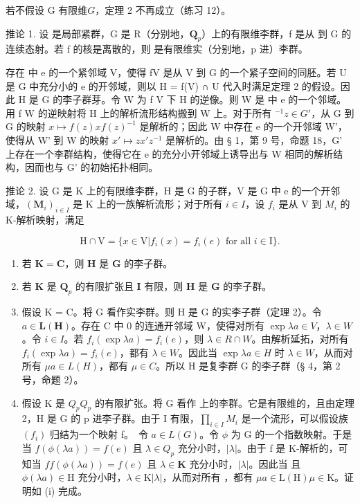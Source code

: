 若不假设 G 有限维\(G\)，定理 2 不再成立（练习 12）。

 推论 1. 设  是局部紧群，G 是 R（分别地，\(\mathbf{Q}_{p}\)）上的有限维李群，f 是从  到 G 的连续态射。若 f 的核是离散的，则  是有限维实（分别地，p 进）李群。

存在  中 e 的一个紧邻域 V，使得 f\textbar V 是从 V 到 G 的一个紧子空间的同胚。若 U 是 G 中充分小的 e 的开邻域，则以 H = f(V) ∩ U 代入时满足定理 2 的假设。因此 H 是 G 的李子群芽。令 W 为 f\textbar{} V 下 H 的逆像。则 W 是  中 e 的一个邻域。用 f\textbar{} W 的逆映射将 H 上的解析流形结构搬到 W 上。对于所有 \(^{-1}\)\(z \in G'\)，从 G 到 G 的映射 \(x \mapsto f(z)xf(z)^{-1}\) 是解析的；因此 W 中存在 e 的一个开邻域 W'，使得从 W' 到 W 的映射 \(x' \mapsto zx'z^{-1}\) 是解析的。由 § 1，第 9 号，命题 18，G' 上存在一个李群结构，使得它在 e 的充分小开邻域上诱导出与 W 相同的解析结构，因而也与 G' 的初始拓扑相同。

推论 2. 设 G 是 K 上的有限维李群，H 是 G 的子群，V 是 G 中 e 的一个开邻域，\((\mathbf{M}_{i})_{i\in I}\) 是 K 上的一族解析流形；对于所有 \(i\in I\)，设 \(f_{i}\) 是从 V 到 \(M_{i}\) 的 K-解析映射，满足

\[
\mathrm{H} \cap \mathrm{V} = \{x \in \mathrm{V} | f _ {i} (x) = f _ {i} (e) \text {   for   all   } i \in \mathrm{I} \}.
\]

\begin{enumerate}
\def\labelenumi{(\roman{enumi})}
\item
  若 \(\mathbf{K} = \mathbf{C}\)，则 \(\mathbf{H}\) 是 \(\mathbf{G}\) 的李子群。
\item
  若 \(\mathbf{K}\) 是 \(\mathbf{Q}_p\) 的有限扩张且 \(\mathbf{I}\) 有限，则 \(\mathbf{H}\) 是 \(\mathbf{G}\) 的李子群。
\item
  假设 K = C。将 G 看作实李群。则 H 是 G 的实李子群（定理 2）。令 \(a \in \mathbf{L}(\mathbf{H})\)。存在 C 中 0 的连通开邻域 W，使得对所有 \(\exp \lambda a \in V\)，\(\lambda \in W\)。令 \(i \in I\)。若 \(f_i(\exp \lambda a) = f_i(e)\)，则 \(\lambda \in R \cap W\)。由解析延拓，对所有 \(f_i(\exp \lambda a) = f_i(e)\)，都有 \(\lambda \in W\)。因此当 \(\exp \lambda a \in H\) 时 \(\lambda \in W\)，从而对所有 \(\mu a \in L(H)\)，都有 \(\mu \in C\)。所以 H 是复李群 G 的李子群（§ 4，第 2 号，命题 2）。
\item
  假设 K 是 \(Q_{p}\)\(Q_{p}\) 的有限扩张。将 G 看作  上的李群。它是有限维的，且由定理 2，H 是 G 的 p 进李子群。由于 I 有限，\(\prod_{i\in I} M_{i}\) 是一个流形，可以假设族 \((f_{i})\) 归结为一个映射 f。~令 \(a \in L(G)\)。令 \(\phi\) 为 G 的一个指数映射。于是当 \(f(\phi(\lambda a)) = f(e)\) 且 \(\lambda \in Q_{p}\) 充分小时，\(|\lambda|\)。由于 f 是 K-解析的，可知当 \(f\)\(f(\phi (\lambda a)) = f(e)\) 且 \(\lambda \in \mathbf{K}\) 充分小时，\(|\lambda|\)。因此当  且 \(\phi (\lambda a) \in \mathrm{H}\) 充分小时，\(\lambda \in \mathrm{K}\)\(|\lambda|\)，从而对所有 ，都有 \(\mu a \in \mathrm{L(H)}\)\(\mu \in \mathrm{K}\)。证明如 (i) 完成。
\end{enumerate}

